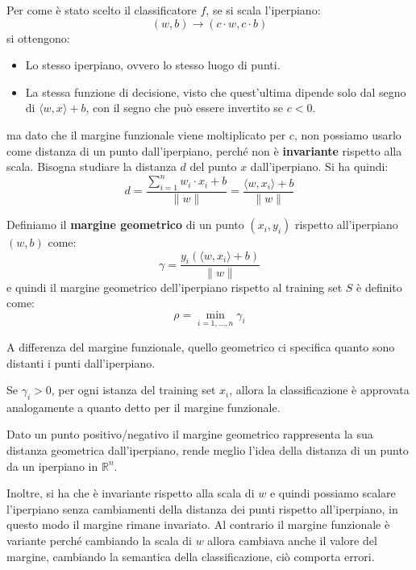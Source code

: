 Per come è stato scelto il classificatore $f$, se si scala l'iperpiano:
\begin{equation}
    (w, b) \to (c \cdot w, c\cdot b)
\end{equation}
si ottengono:
\begin{itemize}
    \item Lo stesso iperpiano, ovvero lo stesso luogo di punti.
    \item La stessa funzione di decisione, visto che quest'ultima dipende solo
          dal segno di $\langle w, x \rangle + b$, con il segno che può essere
          invertito se $c < 0$.
\end{itemize}
ma dato che il margine funzionale viene moltiplicato per $c$, non possiamo usarlo
come distanza di un punto dall'iperpiano, perché non è \textbf{invariante} rispetto
alla scala. Bisogna studiare la distanza $d$ del punto $x$ dall'iperpiano. Si ha
quindi:
\begin{equation}
    d = \frac{\sum_{i = 1} ^ n w_i \cdot x_i + b}{\| w \|} =
    \frac{\langle w, x_i \rangle + b}{\|  w \|}
\end{equation}
\begin{definizione}
    Definiamo il \textbf{margine geometrico} di un punto $(x_i, y_i)$ rispetto
    all'iperpiano $(w, b)$ come:
    \begin{equation}
        \gamma = \frac{y_i(\langle w, x_i \rangle + b)}{\| w \|}
    \end{equation}
    e quindi il margine geometrico dell'iperpiano rispetto al training set $S$ è
    definito come:
    \begin{equation}
        \rho =  \min_{i = 1, \dots, n} {\gamma}_i
    \end{equation}
\end{definizione}
A differenza del margine funzionale, quello geometrico ci specifica quanto
sono distanti i punti dall'iperpiano.
\begin{teorema}
    Se $\gamma_i > 0$, per ogni istanza del training set $x_i$, allora la
    classificazione è approvata analogamente a quanto detto per il margine
    funzionale.
\end{teorema}
Dato un punto positivo/negativo il margine geometrico rappresenta la sua distanza
geometrica dall'iperpiano, rende meglio l'idea della distanza di un punto da un
iperpiano in $\mathbb{R}^n$.

Inoltre, si ha che è invariante rispetto alla scala di $w$ e quindi possiamo
scalare l'iperpiano senza cambiamenti della distanza dei punti rispetto
all'iperpiano, in questo modo il margine rimane invariato. Al contrario il
margine funzionale è variante perché cambiando la scala di $w$ allora cambiava
anche il valore del margine, cambiando la semantica della classificazione, ciò
comporta errori.


